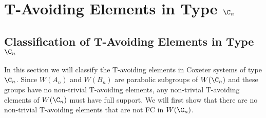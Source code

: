 \chapter{T-Avoiding Elements in Type $\C_n$}\label{chap:Cn}



\section{Classification of T-Avoiding Elements in Type $\C_n$}

In this section we will classify the T-avoiding elements in Coxeter systems of type $\C_n$. Since $W(A_n)$ and $W(B_n)$ are parabolic subgroups of $W(\C_n)$ and these groups have no non-trivial T-avoiding elements,  any non-trivial T-avoiding elements of $W(\C_n)$ must have full support. We will first show that there are no non-trivial T-avoiding elements that are not FC in $W(\C_n)$.

